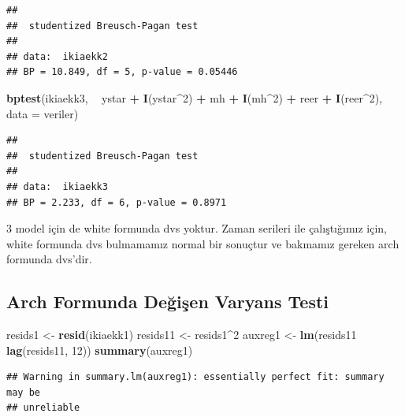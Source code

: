 \documentclass[]{article}
\newenvironment{Shaded}{\begin{snugshade}}{\end{snugshade}}
\newcommand{\KeywordTok}[1]{\textcolor[rgb]{0.13,0.29,0.53}{\textbf{#1}}}
\newcommand{\DataTypeTok}[1]{\textcolor[rgb]{0.13,0.29,0.53}{#1}}
\newcommand{\DecValTok}[1]{\textcolor[rgb]{0.00,0.00,0.81}{#1}}
\newcommand{\StringTok}[1]{\textcolor[rgb]{0.31,0.60,0.02}{#1}}
\newcommand{\OperatorTok}[1]{\textcolor[rgb]{0.81,0.36,0.00}{\textbf{#1}}}
\newcommand{\NormalTok}[1]{#1}
\begin{document}
\begin{verbatim}
## 
##  studentized Breusch-Pagan test
## 
## data:  ikiaekk2
## BP = 10.849, df = 5, p-value = 0.05446
\end{verbatim}

\begin{Shaded}
\begin{Highlighting}[]
\KeywordTok{bptest}\NormalTok{(ikiaekk3, }\OperatorTok{~}\StringTok{ }\NormalTok{ystar }\OperatorTok{+}\StringTok{ }\KeywordTok{I}\NormalTok{(ystar}\OperatorTok{^}\DecValTok{2}\NormalTok{) }\OperatorTok{+}\StringTok{ }\NormalTok{mh }\OperatorTok{+}\StringTok{ }\KeywordTok{I}\NormalTok{(mh}\OperatorTok{^}\DecValTok{2}\NormalTok{) }\OperatorTok{+}\StringTok{ }\NormalTok{reer }\OperatorTok{+}\StringTok{ }\KeywordTok{I}\NormalTok{(reer}\OperatorTok{^}\DecValTok{2}\NormalTok{), }\DataTypeTok{data =}\NormalTok{ veriler)}
\end{Highlighting}
\end{Shaded}

\begin{verbatim}
## 
##  studentized Breusch-Pagan test
## 
## data:  ikiaekk3
## BP = 2.233, df = 6, p-value = 0.8971
\end{verbatim}

3 model için de white formunda dvs yoktur. Zaman serileri ile
çalıştığımız için, white formunda dvs bulmamamız normal bir sonuçtur ve
bakmamız gereken arch formunda dvs'dir.

\subsection{Arch Formunda Değişen Varyans
Testi}\label{arch-formunda-degisen-varyans-testi}

\begin{Shaded}
\begin{Highlighting}[]
\NormalTok{resids1 <-}\StringTok{ }\KeywordTok{resid}\NormalTok{(ikiaekk1)}
\NormalTok{resids11 <-}\StringTok{ }\NormalTok{resids1}\OperatorTok{^}\DecValTok{2}
\NormalTok{auxreg1 <-}\StringTok{ }\KeywordTok{lm}\NormalTok{(resids11 }\OperatorTok{~}\StringTok{ }\KeywordTok{lag}\NormalTok{(resids11, }\DecValTok{12}\NormalTok{))}
\KeywordTok{summary}\NormalTok{(auxreg1)}
\end{Highlighting}
\end{Shaded}

\begin{verbatim}
## Warning in summary.lm(auxreg1): essentially perfect fit: summary may be
## unreliable
\end{verbatim}
\end{document}

